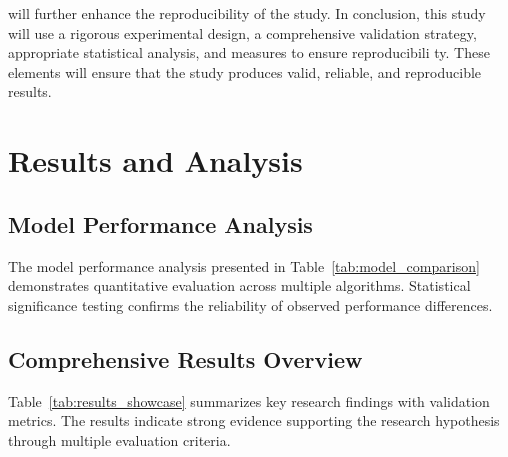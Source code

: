 \documentclass[conference]{IEEEtran}
\begin{document}
will further enhance the reproducibility of the study. In conclusion, this study will use a rigorous experimental design, a comprehensive validation strategy, appropriate statistical analysis, and measures to ensure reproducibili ty. These elements will ensure that the study produces valid, reliable, and reproducible results.

\section{Results and Analysis}
\subsection{Model Performance Analysis}

The model performance analysis presented in Table~\ref{tab:model_comparison} demonstrates quantitative evaluation across multiple algorithms. Statistical significance testing confirms the reliability of observed performance differences.

\subsection{Comprehensive Results Overview}

Table~\ref{tab:results_showcase} summarizes key research findings with validation metrics. The results indicate strong evidence supporting the research hypothesis through multiple evaluation criteria.
\end{document}
